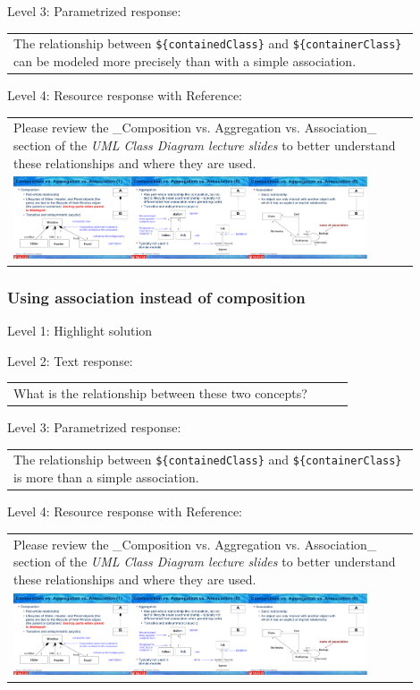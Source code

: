 \noindent Level 3: Parametrized response: \medskip

\begin{tabular}{|p{0.9\linewidth}}
The relationship between \verb|${containedClass}| and \verb|${containerClass}| can be modeled more precisely than with a simple association.
\end{tabular} \medskip

\noindent Level 4: Resource response with Reference: \medskip

\begin{tabular}{|p{0.9\linewidth}}
Please review the _Composition vs. Aggregation vs. Association_ section of 
the \textit{UML Class Diagram lecture slides} to 
better understand these relationships and where they are used.

\\
\includegraphics[width=0.9\textwidth]{images/composition_aggregation_association.png}
\end{tabular} \medskip


\subsubsection{Using association instead of composition}

\noindent Level 1: Highlight solution \medskip

\noindent Level 2: Text response: \medskip

\begin{tabular}{|p{0.9\linewidth}}
What is the relationship between these two concepts?
\end{tabular} \medskip

\noindent Level 3: Parametrized response: \medskip

\begin{tabular}{|p{0.9\linewidth}}
The relationship between \verb|${containedClass}| and \verb|${containerClass}| is more than a simple association.
\end{tabular} \medskip

\noindent Level 4: Resource response with Reference: \medskip

\begin{tabular}{|p{0.9\linewidth}}
Please review the _Composition vs. Aggregation vs. Association_ section of 
the \textit{UML Class Diagram lecture slides} to 
better understand these relationships and where they are used.

\\
\includegraphics[width=0.9\textwidth]{images/composition_aggregation_association.png}
\end{tabular} \medskip


